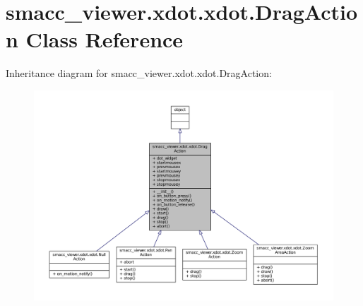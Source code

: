 \hypertarget{classsmacc__viewer_1_1xdot_1_1xdot_1_1DragAction}{}\section{smacc\+\_\+viewer.\+xdot.\+xdot.\+Drag\+Action Class Reference}
\label{classsmacc__viewer_1_1xdot_1_1xdot_1_1DragAction}


Inheritance diagram for smacc\+\_\+viewer.\+xdot.\+xdot.\+Drag\+Action\+:
\nopagebreak
\begin{figure}[H]
\begin{center}
\leavevmode
\includegraphics[width=350pt]{classsmacc__viewer_1_1xdot_1_1xdot_1_1DragAction__inherit__graph}
\end{center}
\end{figure}


